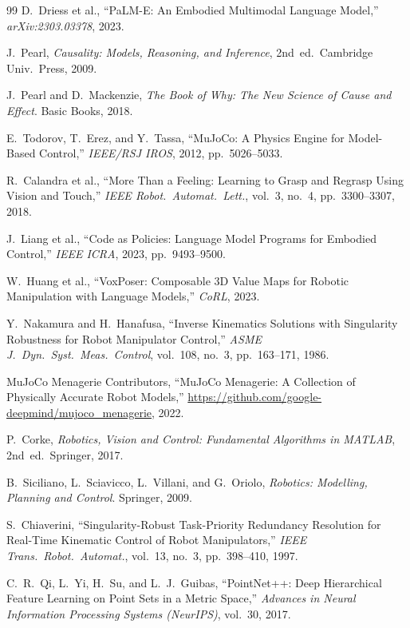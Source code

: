 \documentclass[11pt,a4paper]{report}
\begin{document}
\begin{thebibliography}{99}
D.~Driess et al., ``PaLM-E: An Embodied Multimodal Language Model,''
\emph{arXiv:2303.03378}, 2023.

J.~Pearl, \emph{Causality: Models, Reasoning, and Inference},
2nd~ed.\ Cambridge Univ.\ Press, 2009.

J.~Pearl and D.~Mackenzie, \emph{The Book of Why: The New Science
of Cause and Effect}. Basic Books, 2018.

E.~Todorov, T.~Erez, and Y.~Tassa,
``MuJoCo: A Physics Engine for Model-Based Control,''
\emph{IEEE/RSJ IROS}, 2012, pp.~5026--5033.

R.~Calandra et al., ``More Than a Feeling: Learning to Grasp and
Regrasp Using Vision and Touch,''
\emph{IEEE Robot.\ Automat.\ Lett.}, vol.~3, no.~4,
pp.~3300--3307, 2018.

J.~Liang et al., ``Code as Policies: Language Model Programs for
Embodied Control,'' \emph{IEEE ICRA}, 2023, pp.~9493--9500.

W.~Huang et al., ``VoxPoser: Composable 3D Value Maps for Robotic
Manipulation with Language Models,'' \emph{CoRL}, 2023.

Y.~Nakamura and H.~Hanafusa, ``Inverse Kinematics Solutions with
Singularity Robustness for Robot Manipulator Control,''
\emph{ASME J.\ Dyn.\ Syst.\ Meas.\ Control}, vol.~108, no.~3,
pp.~163--171, 1986.

MuJoCo Menagerie Contributors, ``MuJoCo Menagerie: A Collection of
Physically Accurate Robot Models,''
\url{https://github.com/google-deepmind/mujoco_menagerie}, 2022.

P.~Corke, \emph{Robotics, Vision and Control: Fundamental Algorithms
in MATLAB}, 2nd~ed.\ Springer, 2017.

B.~Siciliano, L.~Sciavicco, L.~Villani, and G.~Oriolo,
\emph{Robotics: Modelling, Planning and Control}. Springer, 2009.

S.~Chiaverini, ``Singularity-Robust Task-Priority Redundancy Resolution
for Real-Time Kinematic Control of Robot Manipulators,''
\emph{IEEE Trans.\ Robot.\ Automat.}, vol.~13, no.~3,
pp.~398--410, 1997.

C.~R.~Qi, L.~Yi, H.~Su, and L.~J.~Guibas,
``PointNet++: Deep Hierarchical Feature Learning on Point Sets in a
Metric Space,''
\emph{Advances in Neural Information Processing Systems (NeurIPS)},
vol.~30, 2017.


\end{thebibliography}
\end{document}
